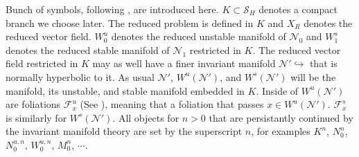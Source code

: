 \documentclass[a4paper,11pt]{article}
\theoremstyle{remark}
\begin{document}
Bunch of symbols, following \cite{Sz1991}, are introduced here. %
$K\subset\mathcal{S}_H$ denotes a compact branch we choose later. The reduced problem is defined in $K$ and $X_R$ denotes the reduced vector field. $W_0^u$ denotes the reduced unstable manifold of $\mathcal{N}_0$ and $W_1^s$ denotes the reduced stable manifold of $\mathcal{N}_1$ restricted in $K$. The reduced vector field restricted in $K$ may as well have a finer invariant manifold $\mathcal{N}' \hookrightarrow$ that is normally hyperbolic to it. As usual $\mathcal{N'}$, $W^u(\mathcal{N}')$, and $W^s(\mathcal{N}')$ will be the manifold, its unstable, and stable manifold embedded in $K$. Inside of $W^u(\mathcal{N}')$ are foliations $\mathcal{F}^u_x$ (See \cite[Theorem 12.2]{fenichel_geometric_1979}), meaning that a foliation that passes $x\in W^u(\mathcal{N}')$. $\mathcal{F}^s_x$ is similarly for $W^s(\mathcal{N}')$.
All objects for $n>0$ that are persistantly continued by the invariant manifold theory are set by the superscript $n$, for examples $K^n$, $N_0^n$, $N_0^{u,n}$, $W_0^{u,n}$, $M_0^n$, $\cdots$. 



% 
% 
% 
\end{document}
